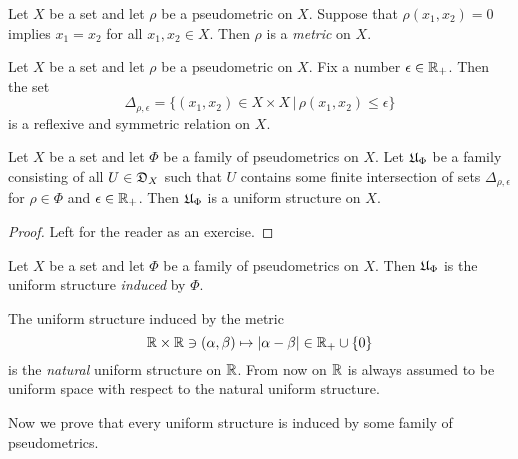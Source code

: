 \documentclass[10pt]{amsart}
\begin{document}
\begin{definition}
	Let $X$ be a set and let $\rho$ be a pseudometric on $X$. Suppose that $\rho(x_1,x_2) = 0$ implies $x_1 = x_2$ for all $x_1,x_2 \in X$. Then $\rho$ is a \textit{metric} on $X$.
\end{definition}
\noindent
Let $X$ be a set and let $\rho$ be a pseudometric on $X$. Fix a number $\epsilon \in {\mathbb R}_+$. Then the set
$$\Delta_{\rho, \epsilon} = \big\{(x_1,x_2) \in X\times X\,\big|\,\rho(x_1, x_2) \leq \epsilon \big\}$$
is a reflexive and symmetric relation on $X$.

\begin{fact}\label{fact:uniform_structures_induced_by_families_of_pseudometrics}
	Let $X$ be a set and let $\Phi$ be a family of pseudometrics on $X$. Let ${\mathfrak U}_{\Phi}$ be a family consisting of all $U\in {\mathfrak D}_X$ such that $U$ contains some finite intersection of sets $\Delta_{\rho, \epsilon}$ for $\rho \in \Phi$ and $\epsilon \in {\mathbb R}_+$. Then ${\mathfrak U}_{\Phi}$ is a uniform structure on $X$.
\end{fact}
\begin{proof}
	Left for the reader as an exercise.
\end{proof}

\begin{definition}
	Let $X$ be a set and let $\Phi$ be a family of pseudometrics on $X$. Then ${\mathfrak U}_{\Phi}$ is the uniform structure \textit{induced} by $\Phi$.
\end{definition}

\begin{example}\label{example:natural_uniform_structure_on_reals}
	The uniform structure induced by the metric
	$${\mathbb R}\times {\mathbb R} \ni (\alpha, \beta) \mapsto |\alpha - \beta| \in {\mathbb R}_+\cup \{0\}$$
	is the \textit{natural} uniform structure on ${\mathbb R}$. From now on ${\mathbb R}$ is always assumed to be uniform space with respect to the natural uniform structure.
\end{example}
\noindent
Now we prove that every uniform structure is induced by some family of pseudometrics.
\end{document}
